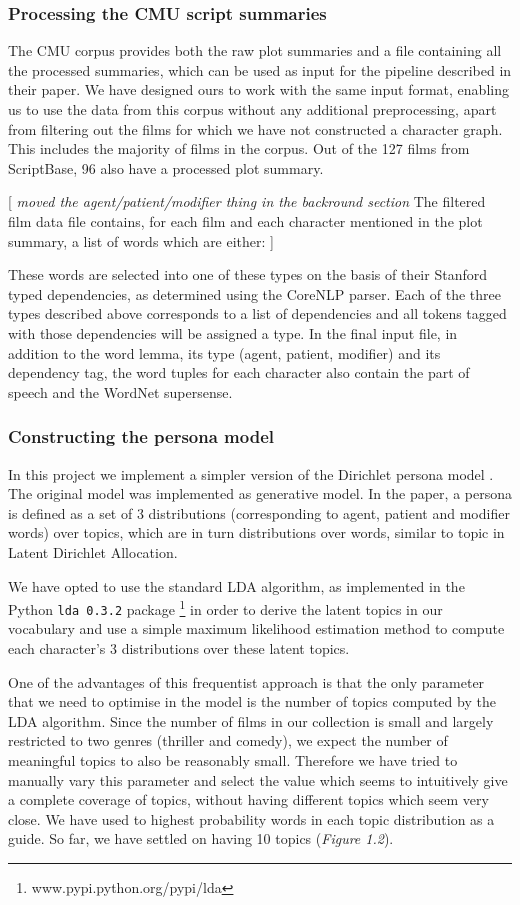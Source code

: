 \documentclass[bsc,frontabs,singlespacing,parskip]{infthesis} %
\begin{document}
\subsubsection{Processing the CMU script summaries}
The CMU corpus provides both the raw plot summaries and a file containing all the processed summaries, which can be used as input for the pipeline described in their paper. We have designed ours to work with the same input format, enabling us to use the data from this corpus without any additional preprocessing, apart from filtering out the films for which we have not constructed a character graph. This includes the majority of films in the corpus. Out of the 127 films from ScriptBase, 96 also have a processed plot summary.


[ \textit{moved the agent/patient/modifier thing in the backround section}
The filtered film data file contains, for each film and each character mentioned in the plot summary, a list of words which are either:
]

These words are selected into one of these types on the basis of their Stanford typed dependencies, as determined using the CoreNLP parser. Each of the three types described above corresponds to a list of dependencies and all tokens tagged with those dependencies will be assigned a type. In the final input file, in addition to the word lemma, its type (agent, patient, modifier) and its dependency tag, the word tuples for each character also contain the part of speech and the WordNet supersense.


\subsubsection{Constructing the persona model}
In this project we implement a simpler version of the Dirichlet persona model \cite{Blei2003}. The original model was implemented as generative model. In the paper, a persona is defined as a set of 3 distributions (corresponding to agent, patient and modifier words) over topics, which are in turn distributions over words, similar to topic in Latent Dirichlet Allocation.

We have opted to use the standard LDA algorithm, as implemented in the Python \texttt{lda 0.3.2} package \footnote{ www.pypi.python.org/pypi/lda} in order to derive the latent topics in our vocabulary and use a simple maximum likelihood estimation method to compute each character's 3 distributions over these latent topics.

One of the advantages of this frequentist approach is that the only parameter that we need to optimise in the model is the number of topics computed by the LDA algorithm. Since the number of films in our collection is small and largely restricted to two genres (thriller and comedy), we expect the number of meaningful topics to also be reasonably small. Therefore we have tried to manually vary this parameter and select the value which seems to intuitively give a complete coverage of topics, without having different topics which seem very close. We have used to highest probability words in each topic distribution as a guide. So far, we have settled on having 10 topics (\textit{Figure 1.2}).
\end{document}
